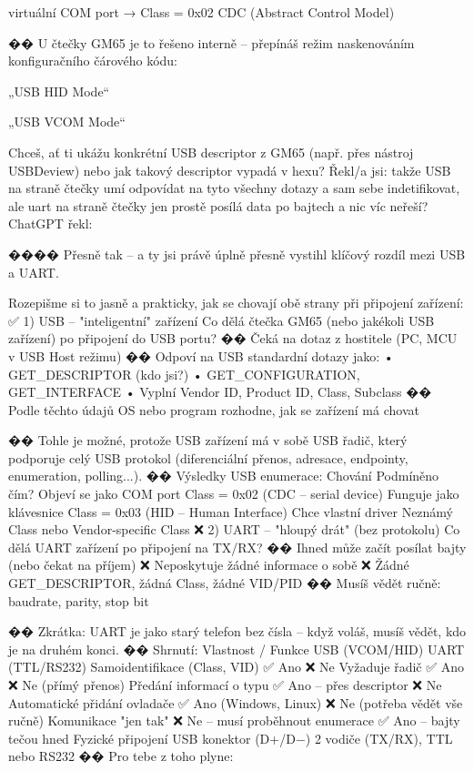     virtuální COM port → Class = 0x02 CDC (Abstract Control Model)

�� U čtečky GM65 je to řešeno interně – přepínáš režim naskenováním konfiguračního čárového kódu:

    „USB HID Mode“

    „USB VCOM Mode“

Chceš, ať ti ukážu konkrétní USB descriptor z GM65 (např. přes nástroj USBDeview) nebo jak takový descriptor vypadá v hexu?
Řekl/a jsi:
takže USB na straně čtečky umí odpovídat na tyto všechny dotazy a sam sebe indetifikovat, ale uart na straně čtečky jen prostě posílá data po bajtech a nic víc neřeší?
ChatGPT řekl:

���� Přesně tak – a ty jsi právě úplně přesně vystihl klíčový rozdíl mezi USB a UART.

Rozepišme si to jasně a prakticky, jak se chovají obě strany při připojení zařízení:
✅ 1) USB – "inteligentní" zařízení
Co dělá čtečka GM65 (nebo jakékoli USB zařízení) po připojení do USB portu?
�� Čeká na dotaz z hostitele (PC, MCU v USB Host režimu)
�� Odpoví na USB standardní dotazy jako:
• GET_DESCRIPTOR (kdo jsi?)
• GET_CONFIGURATION, GET_INTERFACE
• Vyplní Vendor ID, Product ID, Class, Subclass
�� Podle těchto údajů OS nebo program rozhodne, jak se zařízení má chovat

�� Tohle je možné, protože USB zařízení má v sobě USB řadič, který podporuje celý USB protokol (diferenciální přenos, adresace, endpointy, enumeration, polling...).
�� Výsledky USB enumerace:
Chování	Podmíněno čím?
Objeví se jako COM port	Class = 0x02 (CDC – serial device)
Funguje jako klávesnice	Class = 0x03 (HID – Human Interface)
Chce vlastní driver	Neznámý Class nebo Vendor-specific Class
❌ 2) UART – "hloupý drát" (bez protokolu)
Co dělá UART zařízení po připojení na TX/RX?
�� Ihned může začít posílat bajty (nebo čekat na příjem)
❌ Neposkytuje žádné informace o sobě
❌ Žádné GET_DESCRIPTOR, žádná Class, žádné VID/PID
�� Musíš vědět ručně: baudrate, parity, stop bit

�� Zkrátka: UART je jako starý telefon bez čísla – když voláš, musíš vědět, kdo je na druhém konci.
�� Shrnutí:
Vlastnost / Funkce	USB (VCOM/HID)	UART (TTL/RS232)
Samoidentifikace (Class, VID)	✅ Ano	❌ Ne
Vyžaduje řadič	✅ Ano	❌ Ne (přímý přenos)
Předání informací o typu	✅ Ano – přes descriptor	❌ Ne
Automatické přidání ovladače	✅ Ano (Windows, Linux)	❌ Ne (potřeba vědět vše ručně)
Komunikace "jen tak"	❌ Ne – musí proběhnout enumerace	✅ Ano – bajty tečou hned
Fyzické připojení	USB konektor (D+/D−)	2 vodiče (TX/RX), TTL nebo RS232
�� Pro tebe z toho plyne:

